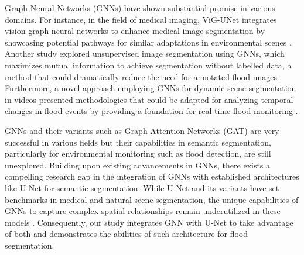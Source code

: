 Graph Neural Networks (GNNs) have shown substantial promise in various domains. For instance, in the field of medical imaging, ViG-UNet integrates vision graph neural networks to enhance medical image segmentation by showcasing potential pathways for similar adaptations in environmental scenes \cite{van2022finite}. Another study explored unsupervised image segmentation using GNNs, which maximizes mutual information to achieve segmentation without labelled data, a method that could dramatically reduce the need for annotated flood images \cite{wong2021meta}. Furthermore, a novel approach employing GNNs for dynamic scene segmentation in videos presented methodologies that could be adapted for analyzing temporal changes in flood events by providing a foundation for real-time flood monitoring \cite{varga2021fast}. 

GNNs and their variants such as Graph Attention Networks (GAT) \cite{velickovic2017graph} are very successful in various fields but their capabilities in semantic segmentation, particularly for environmental monitoring such as flood detection, are still unexplored. Building upon existing advancements in GNNs, there exists a compelling research gap in the integration of GNNs with established architectures like U-Net for semantic segmentation. While U-Net and its variants have set benchmarks in medical and natural scene segmentation, the unique capabilities of GNNs to capture complex spatial relationships remain underutilized in these models \cite{relw2, relw3}. Consequently, our study integrates GNN with U-Net to take advantage of both and demonstrates the abilities of such architecture for flood segmentation.